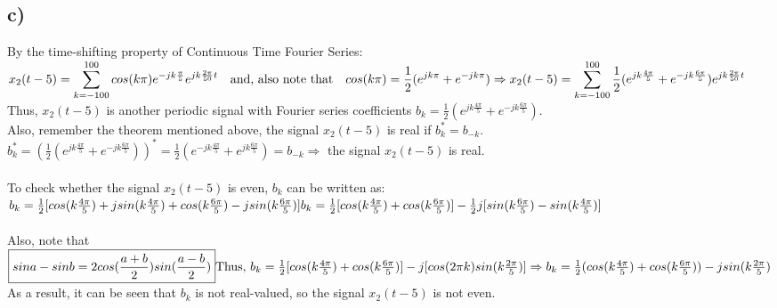 \documentclass[12pt]{article}
\begin{document}
    \subsection*{c)}
    By the time-shifting property of Continuous Time Fourier Series: \\
    \begin{math} x_2(t-5) = \displaystyle\sum_{k=-100}^{100} cos(k\pi) e^{-jk\frac{\pi}{5}}e^{jk\frac{2\pi}{50}t}  \quad \textrm{and, also note that} \quad cos(k\pi) = \frac{1}{2}(e^{jk\pi}+e^{-jk\pi}) \\
    \Rightarrow x_2(t-5) = \displaystyle\sum_{k=-100}^{100} \frac{1}{2}(e^{jk\frac{4\pi}{5}}+e^{-jk\frac{6\pi}{5}}) e^{jk\frac{2\pi}{50}t} \end{math} \\
    Thus, \(x_2(t-5)\) is another periodic signal with Fourier series coefficients \(b_k = \frac{1}{2}(e^{jk\frac{4\pi}{5}}+e^{-jk\frac{6\pi}{5}})\). \\   
    Also, remember the theorem mentioned above, the signal \(x_2(t-5)\) is real if  \(b^{*}_k = b_{-k}\). \\   
    \begin{math} b^{*}_k = (\frac{1}{2}(e^{jk\frac{4\pi}{5}}+e^{-jk\frac{6\pi}{5}}))^{*} = \frac{1}{2}(e^{-jk\frac{4\pi}{5}}+e^{jk\frac{6\pi}{5}}) = b_{-k} \Rightarrow \end{math} the signal \(x_2(t-5)\) is real. \\ \\
To check whether the signal \(x_2(t-5)\) is even, \(b_k\) can be written as: \\
\begin{math} b_k = \frac{1}{2}[cos(k\frac{4\pi}{5}) + jsin(k\frac{4\pi}{5})+ cos(k\frac{6\pi}{5}) - jsin(k\frac{6\pi}{5})] \\
b_k = \frac{1}{2} [cos(k\frac{4\pi}{5})+cos(k\frac{6\pi}{5})] - \frac{1}{2}j[sin(k\frac{6\pi}{5})-sin(k\frac{4\pi}{5})] \end{math} \\ \\
Also, note that \begin{math} \boxed{sina-sinb = 2cos(\frac{a+b}{2})sin(\frac{a-b}{2})} \\ \\ 
\textrm{Thus,} \ b_k = \frac{1}{2}[cos(k\frac{4\pi}{5})+cos(k\frac{6\pi}{5})] - j[cos(2\pi k)sin(k\frac{2\pi}{5})] \\
\Rightarrow b_k = \frac{1}{2}(cos(k\frac{4\pi}{5})+cos(k\frac{6\pi}{5})) - jsin(k\frac{2\pi}{5}) \end{math} \\ 
As a result, it can be seen that \(b_k\) is not real-valued, so the signal \(x_2(t-5)\) is not even. 
\end{document}

